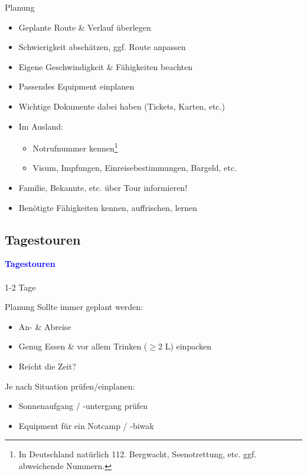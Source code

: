 \documentclass[aspectratio=169]{beamer}
\begin{document}
		\begin{frame}{Planung}
			\begin{itemize}
				\item Geplante Route \& Verlauf überlegen
				\item Schwierigkeit abschätzen, ggf. Route anpassen
				\item Eigene Geschwindigkeit \& Fähigkeiten beachten
				\item Passendes Equipment einplanen
				\item Wichtige Dokumente dabei haben (Tickets, Karten, etc.)
				\item Im Ausland:
				\begin{itemize}
					\item Notrufnummer kennen\footnote{In Deutschland natürlich 112. Bergwacht, Seenotrettung, etc. ggf. abweichende Nummern.}
					\item Visum, Impfungen, Einreisebestimmungen, Bargeld, etc.
				\end{itemize}
				\item Familie, Bekannte, etc. über Tour informieren!
				\item Benötigte Fähigkeiten kennen, auffrischen, lernen
			\end{itemize}
		\end{frame}
	
		\subsection{Tagestouren}
		
			\begin{frame}
				\vspace{1cm}
				\begin{center}
					\textcolor{blue}{\textbf{Tagestouren}}
					\\\,\\
					{\scriptsize 1-2 Tage}
				\end{center}
			\end{frame}
			
			\begin{frame}{Planung}
				Sollte immer geplant werden:
				\begin{itemize}
					\item An- \& Abreise
					\item Genug Essen \& vor allem Trinken ($\geq 2$ L) einpacken
					\item Reicht die Zeit?
				\end{itemize}
				Je nach Situation prüfen/einplanen:
				\begin{itemize}
					\item Sonnenaufgang / -untergang prüfen
					\item Equipment für ein Notcamp / -biwak
				\end{itemize}
			\end{frame}
			
\end{document}
